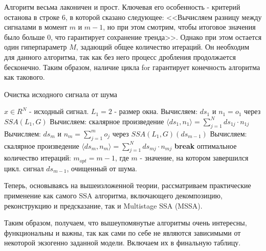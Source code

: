 Алгоритм весьма лаконичен и прост. Ключевая его особенность - критерий останова в строке 6, в которой сказано следующее: <<Вычисляем разницу между сигналами в момент $m$ и $m - 1$, но при этом смотрим, чтобы итоговое значения было больше $0$, что гарантирует сохранение тренда>>. Однако при этом остается один гиперпараметр $M$, задающий общее количество итераций. Он необходим для данного алгоритма, так как без него процесс дробления продолжается бесконечно. Таким образом, наличие цикла for гарантирует конечность алгоритма как такового.
\begin{algorithm}[H]
	\caption{Очистка исходного сигнала от шума} \label{alg::signal_denoising_ssa}
	\begin{algorithmic}[1]
		\Require $x \in R^N$ - исходный сигнал.
		\Require $L_1 = 2$ - размер окна.
		\State Вычисляем: $ds_1$ и $n_1 = o_1$ через $SSA(L_1, G)$
		\State Вычисляем: скалярное произведение $\langle ds_1, n_1 \rangle = \sum_{j = 1}^N ds_{1j} \cdot n_{1j}$
			\State Вычисляем: $ds_m$ и $n_m = \sum_{j = 1}^m o_j$ через $SSA(L_1, G)(ds_{m - 1})$
			\State Вычисляем: скалярное произведение $\langle ds_m, n_m \rangle = \sum_{j = 1}^N ds_{mj} \cdot n_{mj}$
				\State \textbf{break}
			\EndIf
		\EndFor
		\State \Return оптимальное количество итераций: $m_{opt} = m - 1$, где $m$ - значение, на котором завершился цикл.
		\State \Return сигнал $ds_{m - 1}$, очищенный от шума.
	\end{algorithmic}
\end{algorithm}
Теперь, основываясь на вышеизложенной теории, рассматриваем практические применение как самого SSA алгоритма, включающего декомпозицию, реконструкцию и предсказание, так и Multistage SSA (MSSA).





Таким образом, получаем, что вышеупомянутые алгоритмы очень интересны, функциональны и важны, так как сами по себе не являются зависимыми от некоторой экзогенно заданной модели. Включаем их в финальную таблицу.